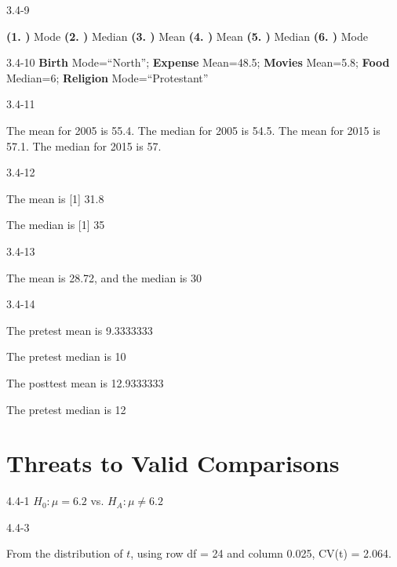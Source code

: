 \begin{exsol@solution}{3.4-9}

  {\bf{(1. )}} Mode  {\bf{(2. )}} Median  {\bf{(3. )}} Mean  {\bf{(4. )}} Mean  {\bf{(5. )}} Median  {\bf{(6. )}} Mode

\end{exsol@solution}
\begin{exsol@solution}{3.4-10}
    {\bf{Birth}} Mode=``North'';   {\bf{Expense}} Mean=48.5; {\bf{Movies}} Mean=5.8; {\bf{Food}} Median=6;  {\bf{Religion}} Mode=``Protestant''

\end{exsol@solution}
\begin{exsol@solution}{3.4-11}



The mean for 2005 is 55.4.
The median for 2005 is 54.5.
The mean for 2015 is 57.1.
The median for 2015 is 57.

\end{exsol@solution}
\begin{exsol@solution}{3.4-12}

	The mean is
[1] 31.8


	The median is
[1] 35


\end{exsol@solution}
\begin{exsol@solution}{3.4-13}




  The mean is 28.72, and the median is 30

\end{exsol@solution}
\begin{exsol@solution}{3.4-14}




	The pretest mean is  9.3333333


	The pretest median is 10


	The posttest mean is	12.9333333


The pretest median is 12


\end{exsol@solution}
\setcounter{chapter}{4}\chapter{Threats to Valid Comparisons}
\begin{exsol@solution}{4.4-1}
	  $H_0: \mu = 6.2$ vs. $H_A: \mu \neq 6.2$
\end{exsol@solution}
\begin{exsol@solution}{4.4-3}

    From the distribution of $t$, using row df = 24 and column 0.025, CV(t) = 2.064.
\end{exsol@solution}
